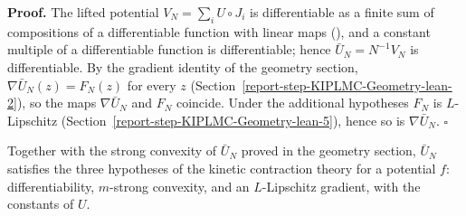 \documentclass[11pt,a4paper]{report}
\begin{document}
\textbf{Proof.} The lifted potential \(V_N=\sum_iU\circ J_i\) is differentiable as a finite sum of compositions of a differentiable function with linear maps (\cite[Section~3.1.3]{LangevinLean2026IPLA}), and a constant multiple of a differentiable function is differentiable; hence \(\bar U_N=N^{-1}V_N\) is differentiable. By the gradient identity of the geometry section, \(\nabla\bar U_N(z)=F_N(z)\) for every \(z\) (Section~\ref{report-step-KIPLMC-Geometry-lean-2}), so the maps \(\nabla\bar U_N\) and \(F_N\) coincide. Under the additional hypotheses \(F_N\) is \(L\)-Lipschitz (Section~\ref{report-step-KIPLMC-Geometry-lean-5}), hence so is \(\nabla\bar U_N\). \(\square\)




Together with the strong convexity of \(\bar U_N\) proved in the geometry section, \(\bar U_N\) satisfies the three hypotheses of the kinetic contraction theory for a potential \(f\): differentiability, \(m\)-strong convexity, and an \(L\)-Lipschitz gradient, with the constants of \(U\).
\end{document}
